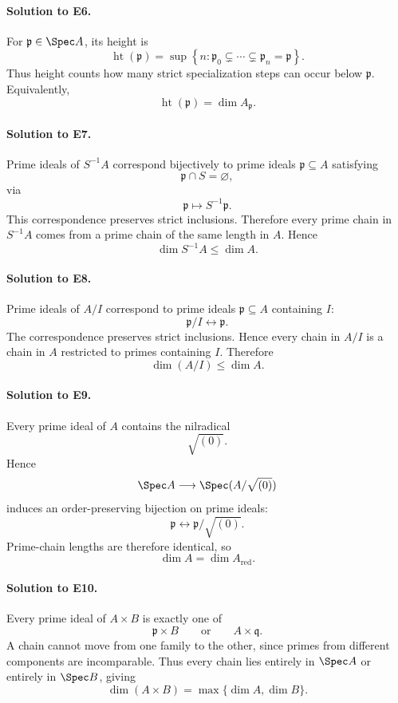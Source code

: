 \paragraph{Solution to E6.}
For \(\mathfrak p\in\Spec A\), its height is
\[
\operatorname{ht}(\mathfrak p)
=
\sup\left\{
n:
\mathfrak p_0\subsetneq\cdots\subsetneq\mathfrak p_n=\mathfrak p
\right\}.
\]
Thus height counts how many strict specialization steps can occur below \(\mathfrak p\).  Equivalently,
\[
\operatorname{ht}(\mathfrak p)=\dim A_{\mathfrak p}.
\]

\paragraph{Solution to E7.}
Prime ideals of \(S^{-1}A\) correspond bijectively to prime ideals
\(\mathfrak p\subseteq A\) satisfying
\[
\mathfrak p\cap S=\varnothing,
\]
via
\[
\mathfrak p\longmapsto S^{-1}\mathfrak p.
\]
This correspondence preserves strict inclusions.  Therefore every prime chain in \(S^{-1}A\) comes
from a prime chain of the same length in \(A\).  Hence
\[
\boxed{\dim S^{-1}A\le\dim A}.
\]

\paragraph{Solution to E8.}
Prime ideals of \(A/I\) correspond to prime ideals \(\mathfrak p\subseteq A\) containing \(I\):
\[
\mathfrak p/I\longleftrightarrow\mathfrak p.
\]
The correspondence preserves strict inclusions.  Hence every chain in \(A/I\) is a chain in \(A\)
restricted to primes containing \(I\).  Therefore
\[
\boxed{\dim(A/I)\le\dim A}.
\]

\paragraph{Solution to E9.}
Every prime ideal of \(A\) contains the nilradical
\[
\sqrt{(0)}.
\]
Hence
\[
\Spec A\longrightarrow\Spec(A/\sqrt{(0)})
\]
induces an order-preserving bijection on prime ideals:
\[
\mathfrak p\longleftrightarrow\mathfrak p/\sqrt{(0)}.
\]
Prime-chain lengths are therefore identical, so
\[
\boxed{\dim A=\dim A_{\mathrm{red}}}.
\]

\paragraph{Solution to E10.}
Every prime ideal of \(A\times B\) is exactly one of
\[
\mathfrak p\times B
\qquad\text{or}\qquad
A\times\mathfrak q.
\]
A chain cannot move from one family to the other, since primes from different components are
incomparable.  Thus every chain lies entirely in \(\Spec A\) or entirely in \(\Spec B\), giving
\[
\boxed{\dim(A\times B)=\max\{\dim A,\dim B\}}.
\]

